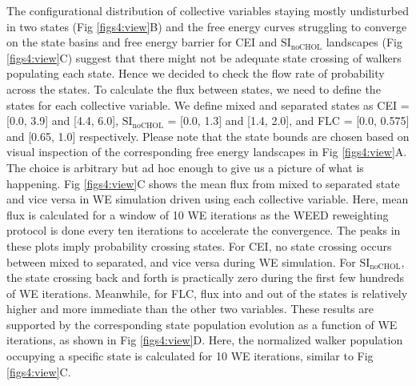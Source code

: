 \documentclass{biophys-new}
\begin{document}
The configurational distribution of collective variables staying mostly undisturbed in two states (Fig \ref{figs4:view}B) and
the free energy curves struggling to converge on the state basins and free energy barrier for CEI and $\text{SI}_{\text{noCHOL}}$ landscapes (Fig \ref{figs4:view}C) 
suggest that there might not be adequate state crossing of walkers populating each state.
Hence we decided to check the flow rate of probability across the states.
To calculate the flux between states, we need to define the states for each collective variable.
We define mixed and separated states as CEI = [0.0, 3.9] and [4.4, 6.0], $\text{SI}_{\text{noCHOL}}$ = [0.0, 1.3] and [1.4, 2.0], and FLC = [0.0, 0.575] and [0.65, 1.0] respectively.
Please note that the state bounds are chosen based on visual inspection of the corresponding free energy landscapes in Fig \ref{figs4:view}A.
The choice is arbitrary but ad hoc enough to give us a picture of what is happening. 
Fig \ref{figs4:view}C shows the mean flux from mixed to separated state and vice versa in WE simulation driven using each collective variable.
Here, mean flux is calculated for a window of 10 WE iterations as the WEED reweighting protocol is done every ten iterations to accelerate the convergence.
The peaks in these plots imply probability crossing states.
For CEI, no state crossing occurs between mixed to separated, and vice versa during WE simulation.
For $\text{SI}_{\text{noCHOL}}$, the state crossing back and forth is practically zero during the first few hundreds of WE iterations.
Meanwhile, for FLC, flux into and out of the states is relatively higher and more immediate than the other two variables.
These results are supported by the corresponding state population evolution as a function of WE iterations, as shown in Fig \ref{figs4:view}D.
Here, the normalized walker population occupying a specific state is calculated for 10 WE iterations, similar to Fig \ref{figs4:view}C.
\end{document}
